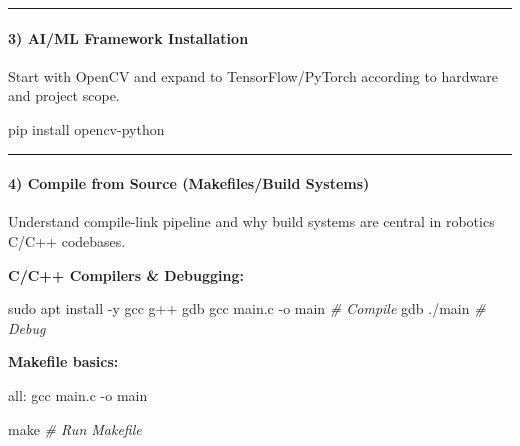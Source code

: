 \documentclass[
  english,
  paper=a4,
  oneside  ,captions=tableheading
]{scrartcl}
\newenvironment{Shaded}{}{}
\newcommand{\AttributeTok}[1]{\textcolor[rgb]{0.49,0.56,0.16}{#1}}
\newcommand{\CommentTok}[1]{\textcolor[rgb]{0.38,0.63,0.69}{\textit{#1}}}
\newcommand{\DecValTok}[1]{\textcolor[rgb]{0.25,0.63,0.44}{#1}}
\newcommand{\ErrorTok}[1]{\textcolor[rgb]{1.00,0.00,0.00}{\textbf{#1}}}
\newcommand{\ExtensionTok}[1]{#1}
\newcommand{\FunctionTok}[1]{\textcolor[rgb]{0.02,0.16,0.49}{#1}}
\newcommand{\NormalTok}[1]{#1}
\begin{document}
\begin{center}\rule{0.5\linewidth}{0.5pt}\end{center}

\paragraph{3) AI/ML Framework
Installation}\label{aiml-framework-installation}

Start with OpenCV and expand to TensorFlow/PyTorch according to hardware
and project scope.

\begin{Shaded}
\begin{Highlighting}[]
\ExtensionTok{pip}\NormalTok{ install opencv{-}python}
\end{Highlighting}
\end{Shaded}

\begin{center}\rule{0.5\linewidth}{0.5pt}\end{center}

\paragraph{4) Compile from Source (Makefiles/Build
Systems)}\label{compile-from-source-makefilesbuild-systems}

Understand compile-link pipeline and why build systems are central in
robotics C/C++ codebases.

\textbf{C/C++ Compilers \& Debugging:}

\begin{Shaded}
\begin{Highlighting}[]
\FunctionTok{sudo}\NormalTok{ apt install }\AttributeTok{{-}y}\NormalTok{ gcc g++ gdb}
\FunctionTok{gcc}\NormalTok{ main.c }\AttributeTok{{-}o}\NormalTok{ main         }\CommentTok{\# Compile}
\FunctionTok{gdb}\NormalTok{ ./main                 }\CommentTok{\# Debug}
\end{Highlighting}
\end{Shaded}

\textbf{Makefile basics:}

\begin{Shaded}
\begin{Highlighting}[]
\DecValTok{all:}
\ErrorTok{    }\NormalTok{gcc main.c {-}o main}
\end{Highlighting}
\end{Shaded}

\begin{Shaded}
\begin{Highlighting}[]
\FunctionTok{make}                       \CommentTok{\# Run Makefile}
\end{Highlighting}
\end{Shaded}
\end{document}

